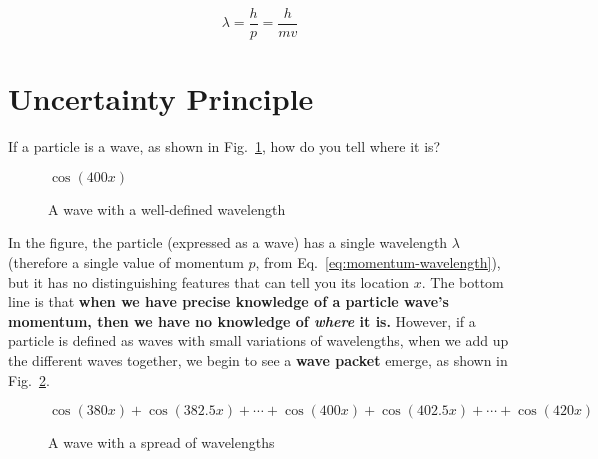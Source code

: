 \documentclass[11pt]{article}
\begin{document}
\begin{equation}
  \boxed{\lambda=\frac{h}{p}=\frac{h}{mv}}
\end{equation}
%
%
%
%
%
\section{Uncertainty Principle}
If a particle is a wave, as shown in Fig.~\ref{fig:everywhere}, how do you
tell where it is?
\begin{figure}[ht]
  \centering
  
  {\footnotesize $\cos(400x)$}
  \caption{A wave with a well-defined wavelength}
  \label{fig:everywhere}
\end{figure}

In the figure, the particle (expressed as a wave) has a single wavelength
$\lambda$ (therefore a single value of momentum $p$, from
Eq.~\ref{eq:momentum-wavelength}), but it has no
distinguishing features that can tell you its location $x$. The bottom line is
that \textbf{when we have precise knowledge of a particle wave's momentum,
  then we have no knowledge of \emph{where} it is.} However, if a particle is
defined as waves with small variations of wavelengths, when we add up the
different waves together, we begin to see a \textbf{wave packet} emerge, as
shown in Fig.~\ref{fig:packet}.
\begin{figure}[ht]
  \centering
  
  {\footnotesize
    $\cos(380x)+\cos(382.5x)+\cdots+\cos(400x)+\cos(402.5x)+\cdots+\cos(420x)$
  }
  \caption{A wave with a spread of wavelengths}
  \label{fig:packet}
\end{figure}
\end{document}
